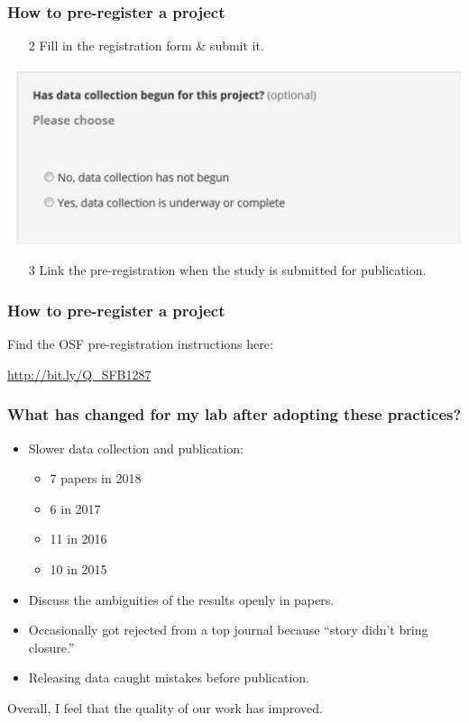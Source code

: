 \documentclass{beamer}
\begin{document}
\begin{frame}
\frametitle{How to pre-register a project}
\begin{itemize}
	\item[2] Fill in the registration form \& submit it.
\end{itemize}
\begin{center}
\includegraphics[scale=0.4]{prereg5.pdf}
\end{center}
\begin{itemize}
	\item[3] Link the pre-registration when the study is submitted for publication.
\end{itemize}
\end{frame}
\begin{frame}
\frametitle{How to pre-register a project}

\begin{LARGE}


Find the OSF pre-registration instructions here:

\url{http://bit.ly/Q_SFB1287}

\end{LARGE}

\end{frame}

\begin{frame}
\frametitle{What has changed for my lab after adopting these practices?}

\begin{itemize}
\item Slower data collection and publication: 
\begin{itemize}
\item 7 papers in 2018
\item 6 in 2017
\item 11 in 2016
\item  10 in 2015
\end{itemize}
\item  Discuss the ambiguities of the results openly in papers. 
\item Occasionally got rejected from a top journal because ``story didn't bring closure.''
\item Releasing data caught mistakes before publication.
\end{itemize}

Overall, I feel that the quality of our work has improved. 

\end{frame}
\end{document}
